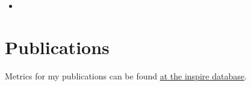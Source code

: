\documentclass[11pt,a4paper,sans]{moderncv}        %
\begin{document}
\begin{itemize}
		\vspace{4pt}
		
		\item{}
	\end{itemize}
	
	\section{Publications}
	
	\vspace{1pt}


	\vspace{5pt}
	
	Metrics for my publications can be found {\color{blue}\href{https://inspirehep.net/literature?sort=mostrecent&size=25&page=1&q=a\%20a.antonelli.3&ui-citation-summary=true}{at the inspire database}}.
	
\end{document}
